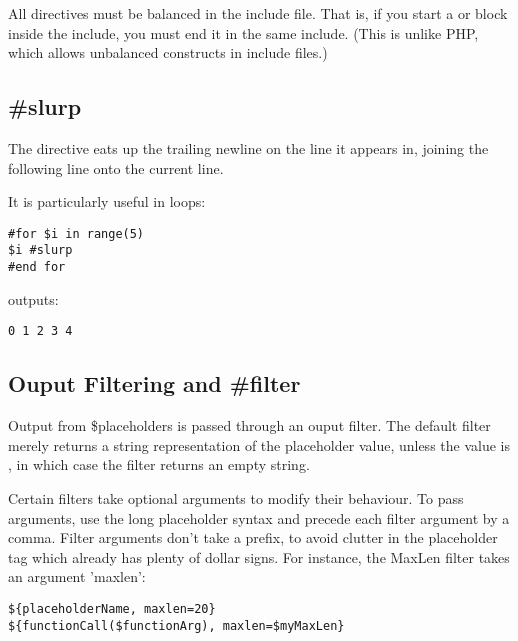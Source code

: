 All directives must be balanced in the include file.  That is, if you start
a  or  block inside the include, you must end it in
the same include.  (This is unlike PHP, which allows unbalanced constructs
in include files.)



\subsection{\#slurp}
\label{output.slurp}

The  directive eats up the trailing newline on the line it
appears in, joining the following line onto the current line.


It is particularly useful in  loops:
\begin{verbatim}
#for $i in range(5)
$i #slurp
#end for
\end{verbatim}
outputs:
\begin{verbatim}
0 1 2 3 4
\end{verbatim}


\subsection{Ouput Filtering and \#filter}
\label{output.filter}

Output from \$placeholders is passed through an ouput filter.  The default
filter merely returns a string representation of the placeholder value,
unless the value is , in which case the filter returns an empty
string. 

Certain filters take optional arguments to modify their behaviour.  To pass
arguments, use the long placeholder syntax and precede each filter argument by
a comma.  Filter arguments don't take a \code{\$} prefix, to avoid clutter in
the placeholder tag which already has plenty of dollar signs.  For instance,
the MaxLen filter takes an argument 'maxlen':

\begin{verbatim}
${placeholderName, maxlen=20}
${functionCall($functionArg), maxlen=$myMaxLen}
\end{verbatim}

